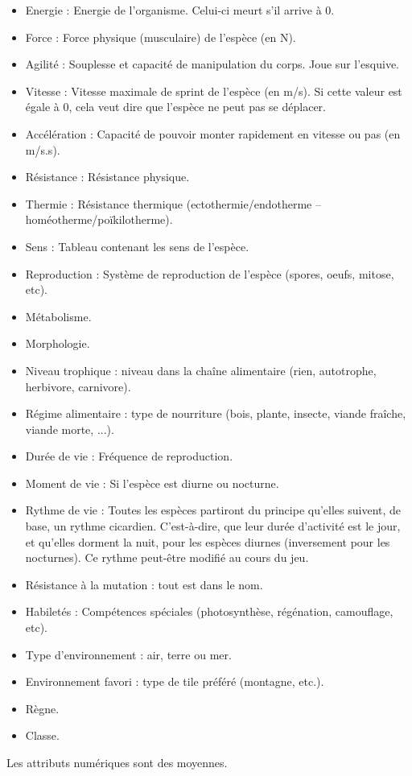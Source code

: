 \begin{itemize}
	\item Energie : Energie de l'organisme. Celui-ci meurt s'il arrive à 0.
	\item Force : Force physique (musculaire) de l'espèce (en N).
	\item Agilité : Souplesse et capacité de manipulation du corps. Joue sur l'esquive.
	\item Vitesse : Vitesse maximale de sprint de l'espèce (en m/s). Si cette valeur est égale à 0, cela veut dire que l'espèce ne peut pas se déplacer.
	\item Accélération : Capacité de pouvoir monter rapidement en vitesse ou pas (en m/s.s).
	\item Résistance : Résistance physique.
	\item Thermie : Résistance thermique (ectothermie/endotherme -- homéotherme/poïkilotherme).
	\item Sens : Tableau contenant les sens de l'espèce.
	\item Reproduction : Système de reproduction de l'espèce (spores, oeufs, mitose, etc).
	\item Métabolisme.
	\item Morphologie.
	\item Niveau trophique : niveau dans la chaîne alimentaire (rien, autotrophe, herbivore, carnivore).
	\item Régime alimentaire : type de nourriture (bois, plante, insecte, viande fraîche, viande morte, ...).
	\item Durée de vie : Fréquence de reproduction.
	\item Moment de vie : Si l'espèce est diurne ou nocturne.
	\item Rythme de vie : Toutes les espèces partiront du principe qu'elles suivent, de base, un rythme cicardien. C'est-à-dire, que leur durée d'activité est le jour, et qu'elles dorment la nuit, pour les espèces diurnes (inversement pour les nocturnes). Ce rythme peut-être modifié au cours du jeu.
	\item Résistance à la mutation : tout est dans le nom.
	\item Habiletés : Compétences spéciales (photosynthèse, régénation, camouflage, etc).
	\item Type d'environnement : air, terre ou mer.
	\item Environnement favori : type de tile préféré (montagne, etc.).
	\item Règne.
	\item Classe. 
\end{itemize}
Les attributs numériques sont des moyennes.